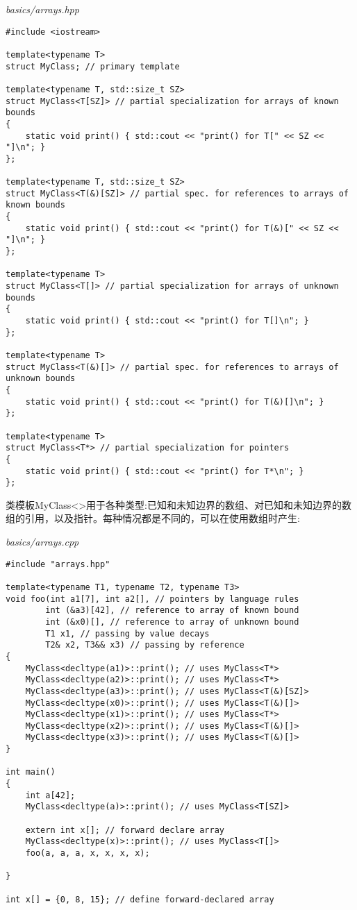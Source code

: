 \noindent
\textit{basics/arrays.hpp}
\begin{lstlisting}[style=styleCXX]
#include <iostream>

template<typename T>
struct MyClass; // primary template

template<typename T, std::size_t SZ>
struct MyClass<T[SZ]> // partial specialization for arrays of known bounds
{
	static void print() { std::cout << "print() for T[" << SZ << "]\n"; }
};

template<typename T, std::size_t SZ>
struct MyClass<T(&)[SZ]> // partial spec. for references to arrays of known bounds
{
	static void print() { std::cout << "print() for T(&)[" << SZ << "]\n"; }
};

template<typename T>
struct MyClass<T[]> // partial specialization for arrays of unknown bounds
{
	static void print() { std::cout << "print() for T[]\n"; }
};

template<typename T>
struct MyClass<T(&)[]> // partial spec. for references to arrays of unknown bounds
{
	static void print() { std::cout << "print() for T(&)[]\n"; }
};

template<typename T>
struct MyClass<T*> // partial specialization for pointers
{
	static void print() { std::cout << "print() for T*\n"; }
};
\end{lstlisting}

类模板MyClass<>用于各种类型:已知和未知边界的数组、对已知和未知边界的数组的引用，以及指针。每种情况都是不同的，可以在使用数组时产生:

\noindent
\textit{basics/arrays.cpp}
\begin{lstlisting}[style=styleCXX]
#include "arrays.hpp"

template<typename T1, typename T2, typename T3>
void foo(int a1[7], int a2[], // pointers by language rules
		int (&a3)[42], // reference to array of known bound
		int (&x0)[], // reference to array of unknown bound
		T1 x1, // passing by value decays
		T2& x2, T3&& x3) // passing by reference
{
	MyClass<decltype(a1)>::print(); // uses MyClass<T*>
	MyClass<decltype(a2)>::print(); // uses MyClass<T*>
	MyClass<decltype(a3)>::print(); // uses MyClass<T(&)[SZ]>
	MyClass<decltype(x0)>::print(); // uses MyClass<T(&)[]>
	MyClass<decltype(x1)>::print(); // uses MyClass<T*>
	MyClass<decltype(x2)>::print(); // uses MyClass<T(&)[]>
	MyClass<decltype(x3)>::print(); // uses MyClass<T(&)[]>
}

int main()
{
	int a[42];
	MyClass<decltype(a)>::print(); // uses MyClass<T[SZ]>
	
	extern int x[]; // forward declare array
	MyClass<decltype(x)>::print(); // uses MyClass<T[]>
	foo(a, a, a, x, x, x, x);
	
}

int x[] = {0, 8, 15}; // define forward-declared array
\end{lstlisting}

